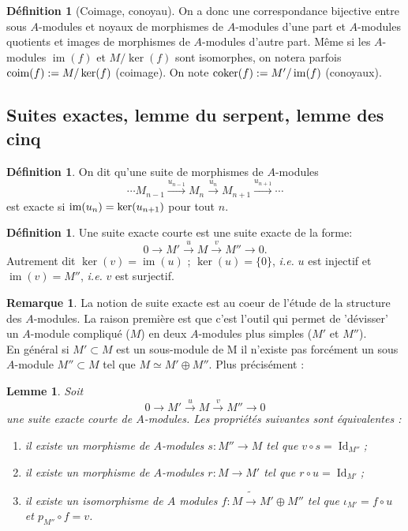 \documentclass[a4paper, oneside, 12pt]{book}
\theoremstyle{theoremeStyle} %
\newtheorem{lemme}[theoreme]{Lemme}
\theoremstyle{definition} %
\newtheorem{definition}[theoreme]{Définition}
\newtheorem{remarque}[theoreme]{Remarque}
\newcommand{\ie}{\textit{i.e.}} %
\DeclareMathOperator{\im}{im}
\DeclareMathOperator{\Id}{Id}
\begin{document}
\begin{definition}[Coimage, conoyau]On a donc une correspondance bijective entre sous $A$-modules et noyaux de morphismes de $A$-modules d'une part et $A$-modules quotients et images de morphismes de $A$-modules d'autre part. Même si les $A$-modules $\im(f)$ et $M/\ker(f)$ sont isomorphes, on notera parfois $\hbox{\rm coim}(f):=M/\ker(f)$ (coimage). On note $\hbox{\rm coker}(f):=M'/\im(f)$ (conoyaux).
\end{definition}

\subsection{Suites exactes, lemme du serpent, lemme des cinq}\label{SuiteExacte}


\begin{definition}On dit qu'une suite de morphismes de $A$-modules
$$   \cdots M_{n-1}\stackrel{u_{n-1}}{\rightarrow}  M_n\stackrel{u_{n}}{\rightarrow} M_{n+1}\stackrel{u_{n+1}}{\rightarrow} \cdots$$
est exacte si $\hbox{\rm im}(u_{n})=\ker(u_{n+1})$ pour tout $n$.
\end{definition}

\begin{definition}
	Une suite exacte courte est une suite exacte de la forme:
$$0\rightarrow M'\stackrel{u}{\rightarrow} M\stackrel{v}{\rightarrow} M''\rightarrow 0.$$
Autrement dit $\ker(v) = \im(u)$ ; $\ker(u) = \{0\} $, \ie{} $u$ est injectif et $\im(v) = M''$, \ie{} $v$ est surjectif.\end{definition}

\begin{remarque}La notion de suite exacte est au coeur de l'étude de la structure des $A$-modules. La raison première est que c'est l'outil qui permet de 'dévisser' un $A$-module compliqué ($M$) en deux $A$-modules plus simples ($M'$ et $M''$).\\
En général si $M'\subset M$ est un sous-module de M il n'existe pas forcément un sous $A$-module $M''\subset M$ tel que $M\simeq M'\oplus M''$. Plus précisément :\end{remarque}

\begin{lemme}Soit $$0\rightarrow M'\stackrel{u}{\rightarrow} M\stackrel{v}{\rightarrow}  M''\rightarrow 0$$
une suite exacte courte de $A$-modules. Les propriétés suivantes sont équivalentes :
\begin{enumerate}
\item il existe un morphisme de $A$-modules $s:M''\rightarrow M$ tel que $v\circ s=\Id_{M''}$;
\item il existe un morphisme de $A$-modules $r:M \rightarrow M'$ tel que $r\circ u=\Id_{M'}$;
\item il existe un isomorphisme de $A$ modules $f:M\tilde{\rightarrow}M'\oplus M''$ tel que $\iota_{M'}=f\circ u$ et $p_{M''}\circ f=v$.\\
\end{enumerate}
\end{lemme}
\end{document}
